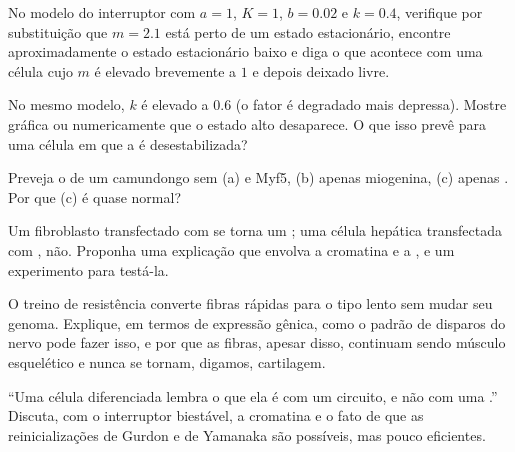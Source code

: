 \begin{exercise}[$\star\star$]\label{exo:b2:cell-differentiation:7}
No modelo do interruptor com $a = 1$, $K = 1$, $b = 0.02$ e $k = 0.4$,
verifique por substituição que $m = 2.1$ está perto de um estado
estacionário, encontre aproximadamente o estado estacionário baixo e
diga o que acontece com uma célula cujo $m$ é elevado brevemente a $1$
e depois deixado livre.
\end{exercise}

\begin{exercise}[$\star\star$]\label{exo:b2:cell-differentiation:8}
No mesmo modelo, $k$ é elevado a $0.6$ (o fator é degradado mais
depressa). Mostre gráfica ou numericamente que o estado alto
desaparece. O que isso prevê para uma célula em que a  é
desestabilizada?
\end{exercise}

\begin{exercise}[$\star\star$]\label{exo:b2:cell-differentiation:9}
Preveja o  de um camundongo sem (a)  e Myf5, (b) apenas
miogenina, (c) apenas . Por que (c) é quase normal?
\end{exercise}

\begin{exercise}[$\star\star\star$]\label{exo:b2:cell-differentiation:10}
Um fibroblasto transfectado com  se torna um ; uma célula
hepática transfectada com , não. Proponha uma explicação que
envolva a cromatina e a , e um experimento para testá-la.
\end{exercise}

\begin{exercise}[$\star\star\star$]\label{exo:b2:cell-differentiation:11}
O treino de resistência converte fibras rápidas para o tipo lento sem
mudar seu genoma. Explique, em termos de expressão gênica, como o
padrão de disparos do nervo pode fazer isso, e por que as fibras,
apesar disso, continuam sendo músculo esquelético e nunca se tornam,
digamos, cartilagem.
\end{exercise}

\begin{exercise}[$\star\star\star$]\label{exo:b2:cell-differentiation:12}
``Uma célula diferenciada lembra o que ela é com um circuito, e não com
uma .'' Discuta, com o interruptor biestável, a cromatina e o
fato de que as reinicializações de Gurdon e de Yamanaka são possíveis,
mas pouco eficientes.
\end{exercise}

